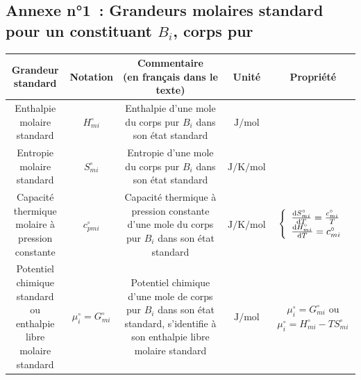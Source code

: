 \documentclass{article}
\begin{document}
\subsection*{Annexe n°1~: Grandeurs molaires standard pour un constituant $B_i$, corps pur}
\begin{tabular}{|c|c|c|c|c|} 
\hline
\makecell{\textbf{Grandeur}\\\textbf{standard}} & \textbf{Notation} & \makecell{\textbf{Commentaire}\\\textbf{(en français dans le texte)}} & \textbf{Unité} & \textbf{Propriété}\\ 
\hline
\makecell{Enthalpie molaire\\standard} & $H_{mi}^\circ$ & \makecell{Enthalpie d’une mole du\\corps pur $B_i$ dans son\\état standard} & $\si{\joule\per\mole}$ & \\ 
\hline
\makecell{Entropie molaire\\standard} & $S_{mi}^\circ$ & \makecell{Entropie d’une mole du\\corps pur $B_i$ dans son\\état standard} & $\si{\joule\per\kelvin\per\mole}$ & \\ 
\hline
\makecell{Capacité thermique\\molaire à pression\\constante} & $c_{pmi}^\circ$ & \makecell{Capacité thermique à\\pression constante d’une\\mole du corps pur $B_i$\\dans son état standard} & $\si{\joule\per\kelvin\per\mole}$ & $\left\{\begin{array}{l} \dv{S_{mi}^\circ}{T} = \frac{c_{mi}^\circ}{T}\\\dv{H_{mi}^\circ}{T} = c_{mi}^\circ\end{array}\right.$\\ 
\hline
\makecell{Potentiel chimique\\standard ou\\enthalpie libre\\molaire standard} & $\mu_{i}^\circ=G_{mi}^\circ$ & \makecell{Potentiel chimique d’une\\mole de corps pur $B_i$\\ dans son état standard,\\s’identifie à son enthalpie\\libre molaire standard} & $\si{\joule\per\mole}$ & \makecell{$\mu_{i}^\circ=G_{mi}^\circ$\\ou\\$\mu_{i}^\circ= H_{mi}^\circ - TS_{mi}^\circ$} \\
\hline
\end{tabular}
\end{document}
